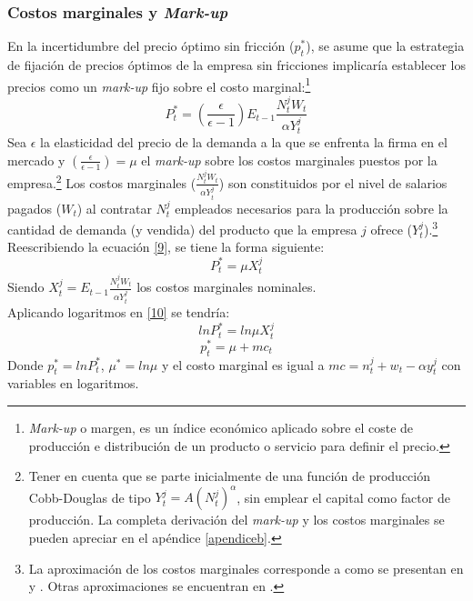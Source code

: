 \subsubsection*{Costos marginales y \textit{Mark-up}}\label{seccioncm}
En la incertidumbre  del precio óptimo sin fricción ($p_{t}^*$), se asume que la estrategia de fijación de precios óptimos de la empresa sin fricciones implicaría establecer los precios como un \textit{mark-up} fijo sobre el costo marginal:\footnote{\textit{Mark-up} o margen, es un índice económico aplicado sobre el coste de producción e distribución de un producto o servicio para definir el precio.}
 \begin{equation}\label{9}
P_{t}^*=\left( \frac{\epsilon}{\epsilon-1}\right) E_{t-1}\frac{N_{t}^{j}W_{t}}{\alpha Y_{t}^{j}}
\end{equation}
Sea $\epsilon$ la elasticidad del precio de la demanda a la que se enfrenta la firma en el mercado y $(\frac{\epsilon}{\epsilon-1})=\mu$ el \textit{mark-up} sobre los costos marginales puestos por la empresa.\footnote{Tener en cuenta  que se parte inicialmente de una función de producción Cobb-Douglas de tipo $ Y_{t}^{j}=A(N_{t}^{j})^{\alpha}$, sin emplear el capital como factor de producción. La completa derivación del  \textit{mark-up} y los costos marginales se pueden apreciar en el apéndice \ref{apendiceb}.} Los costos marginales ($\frac{N_{t}^{j}W_{t}}{\alpha Y_{t}^{j}}$) son constituidos por el nivel de salarios pagados ($W_{t}$) al contratar $N_{t}^{j}$ empleados necesarios para la producción sobre la cantidad de demanda (y vendida) del producto que la empresa $j$ ofrece ($Y_{t}^{j}$).\footnote{La aproximación de los costos marginales corresponde a \cite{gagnon2005new} como se presentan en \cite{galvis2010estimacion} y \cite{cespedes2005new}. Otras aproximaciones se encuentran en \cite{woodford2011interest}.}\\

Reescribiendo la ecuación \eqref{9}, se tiene la forma siguiente:
  \begin{equation}\label{10}
P_{t}^*=\mu X_{t}^{j}
\end{equation}
 Siendo $X_{t}^{j}=E_{t-1}\frac{N_{t}^{j}W_{t}}{\alpha Y_{t}^{j}}$ los costos marginales nominales.\\
   
Aplicando logaritmos en  \eqref{10}  se tendría:
 \begin{equation}\label{11}
lnP_{t}^*=ln \mu X_{t}^{j}
\end{equation}
 \begin{equation}\label{12}
p_{t}^*=\mu +mc_{t}
\end{equation}
Donde $p_{t}^*=ln P_{t}^*$, $\mu^{*}=ln \mu$ y el costo marginal es igual a $mc=n_{t}^{j}+w_{t}-\alpha y_{t}^{j}$ con variables en logaritmos.\\

